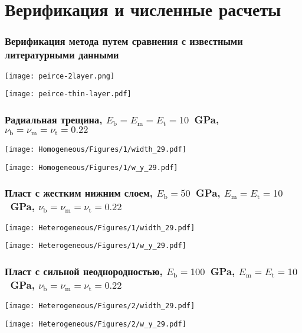 \section{Верификация и численные расчеты}

\begin{frame}
    \frametitle{Верификация метода путем сравнения с известными литературными данными}

    \begin{minipage}[t]{0.4\linewidth}
        \texttt{[image: peirce-2layer.png]}
    \end{minipage}
    \hfill
    \begin{minipage}[t]{0.57\linewidth}
        \texttt{[image: peirce-thin-layer.pdf]}
    \end{minipage}
\end{frame}

\begin{frame}
    \frametitle{Радиальная трещина, $E_\text{b} = E_\text{m} = E_\text{t} = 10$~GPa, $\nu_\text{b} = \nu_\text{m} = \nu_\text{t} = 0.22$}
    \begin{minipage}[t]{0.4\linewidth}
        \texttt{[image: Homogeneous/Figures/1/width\_29.pdf]}
    \end{minipage}
    \hfill
    \begin{minipage}[t]{0.57\linewidth}
        \texttt{[image: Homogeneous/Figures/1/w\_y\_29.pdf]}
    \end{minipage}
\end{frame}

\begin{frame}
    \frametitle{Пласт с жестким нижним слоем, $E_\text{b} = 50$~GPa, $E_\text{m} = E_\text{t} = 10$~GPa, $\nu_\text{b} = \nu_\text{m} = \nu_\text{t} = 0.22$}
    \begin{minipage}[t]{0.4\linewidth}
        \texttt{[image: Heterogeneous/Figures/1/width\_29.pdf]}
    \end{minipage}
    \hfill
    \begin{minipage}[t]{0.57\linewidth}
        \texttt{[image: Heterogeneous/Figures/1/w\_y\_29.pdf]}
    \end{minipage}
\end{frame}

\begin{frame}
    \frametitle{Пласт с сильной неоднородностью, $E_\text{b} = 100$~GPa, $E_\text{m} = E_\text{t} = 10$~GPa, $\nu_\text{b} = \nu_\text{m} = \nu_\text{t} = 0.22$}
    \begin{minipage}[t]{0.4\linewidth}
        \texttt{[image: Heterogeneous/Figures/2/width\_29.pdf]}
    \end{minipage}
    \hfill
    \begin{minipage}[t]{0.57\linewidth}
        \texttt{[image: Heterogeneous/Figures/2/w\_y\_29.pdf]}
    \end{minipage}
\end{frame}

